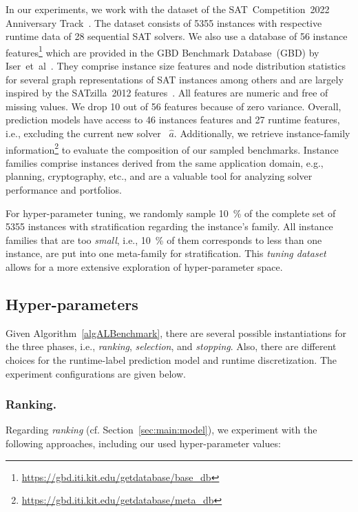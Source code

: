 \documentclass[runningheads]{llncs}
\begin{document}
In our experiments, we work with the dataset of the SAT~Competition~2022 Anniversary Track~\cite{sat2022}.
The dataset consists of 5355 instances with respective runtime data of 28 sequential SAT solvers.
We also use a database of 56 instance features\footnote{\url{https://gbd.iti.kit.edu/getdatabase/base_db}} which are provided in the GBD Benchmark Database~(GBD) by Iser~et~al~\cite{IserS18}.
They comprise instance size features and node distribution statistics for several graph representations of SAT instances among others and are largely inspired by the SATzilla~2012 features~\cite{features}.
All features are numeric and free of missing values.
We drop 10 out of 56 features because of zero variance.
Overall, prediction models have access to 46 instances features and 27 runtime features, i.e., excluding the current new solver~ $\hat{a}$.
Additionally, we retrieve instance-family information\footnote{\url{https://gbd.iti.kit.edu/getdatabase/meta_db}} to evaluate the composition of our sampled benchmarks.
Instance families comprise instances derived from the same application domain, e.g., planning, cryptography, etc., and are a valuable tool for analyzing solver performance and portfolios.

For hyper-parameter tuning, we randomly sample \SI{10}{\%} of the complete set of 5355 instances with stratification regarding the instance's family.
All instance families that are too \emph{small}, i.e., \SI{10}{\%} of them corresponds to less than one instance, are put into one meta-family for stratification.
This \emph{tuning dataset} allows for a more extensive exploration of hyper-parameter space.

\subsection{Hyper-parameters}
\label{sec:exdesign:hyper}

Given Algorithm~\ref{algALBenchmark}, there are several possible instantiations for the three phases, i.e., \emph{ranking}, \emph{selection}, and \emph{stopping}.
Also, there are different choices for the runtime-label prediction model and runtime discretization.
The experiment configurations are given below.

\subsubsection{Ranking.}

Regarding \emph{ranking} (cf. Section~\ref{sec:main:model}), we experiment with the following approaches, including our used hyper-parameter values:
\end{document}
